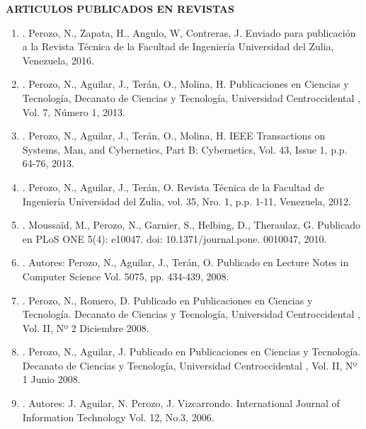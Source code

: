 \noindent\textbf{ARTICULOS PUBLICADOS EN REVISTAS}

\begin{enumerate}
\item {}. Perozo, N., Zapata, H., Angulo, W, Contreras, J. Enviado para publicación a la Revista Técnica de la Facultad de Ingeniería Universidad del Zulia, Venezuela, 2016.
\item {}. Perozo, N., Aguilar, J., Terán, O., Molina, H. Publicaciones en Ciencias y Tecnología, Decanato de Ciencias y Tecnología, Universidad Centroccidental , Vol. 7, Número 1, 2013.
\item {}. Perozo, N., Aguilar, J., Terán, O., Molina, H. IEEE Transactions on Systems, Man, and Cybernetics, Part B: Cybernetics, Vol. 43, Issue 1, p.p. 64-76, 2013.
\item {}. Perozo, N., Aguilar, J., Terán, O. Revista Técnica de la Facultad de Ingeniería Universidad del Zulia, vol. 35, Nro. 1, p.p. 1-11, Venezuela, 2012.
\item {}. Moussaïd, M., Perozo, N., Garnier, S., Helbing, D., Theraulaz, G. Publicado en PLoS ONE 5(4): e10047. doi: 10.1371/journal.pone. 0010047, 2010.
\item {}. Autores: Perozo, N., Aguilar, J., Terán, O. Publicado en Lecture Notes in Computer Science Vol. 5075, pp. 434-439, 2008.
\item {}. Perozo, N., Romero, D. Publicado en Publicaciones en Ciencias y Tecnología. Decanato de Ciencias y Tecnología, Universidad Centroccidental , Vol. II, Nº 2 Diciembre 2008.
\item {}. Perozo, N., Aguilar, J. Publicado en Publicaciones en Ciencias y Tecnología. Decanato de Ciencias y Tecnología, Universidad Centroccidental , Vol. II, Nº 1 Junio 2008.
\item {}. Autores: J. Aguilar, N. Perozo, J. Vizcarrondo. International Journal of Information Technology Vol. 12, No.3, 2006.

\end{enumerate}
